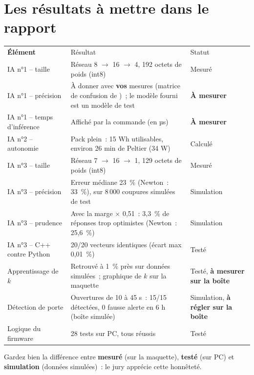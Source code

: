 \section{Les résultats à mettre dans le rapport}\label{sec:resultats}
\begin{tabularx}{\linewidth}{P{4.4cm}LP{2.6cm}}
 \textbf{Élément} & Résultat & Statut \\
IA n°1 -- taille & Réseau 8 $\rightarrow$ 16 $\rightarrow$ 4, 192 octets de poids (int8) & Mesuré \\
IA n°1 -- précision & À donner avec \textbf{vos} mesures (matrice de confusion de )~; le modèle fourni est un modèle de test & \textbf{À mesurer} \\
IA n°1 -- temps d'inférence & Affiché par la commande  (en µs) & \textbf{À mesurer} \\
IA n°2 -- autonomie & Pack plein~: 15 Wh utilisables, environ 26 min de Peltier (34 W) & Calculé \\
IA n°3 -- taille & Réseau 7 $\rightarrow$ 16 $\rightarrow$ 1, 129 octets de poids (int8) & Mesuré \\
IA n°3 -- précision & Erreur médiane 23~\% (Newton~: 33~\%), sur 8\,000 coupures simulées de test & Simulation \\
IA n°3 -- prudence & Avec la marge $\times$ 0,51~: 3,3~\% de réponses trop optimistes (Newton~: 25,6~\%) & Simulation \\
IA n°3 -- C++ contre Python & 20/20 vecteurs identiques (écart max 0,01~\%) & Testé \\
Apprentissage de $k$ & Retrouvé à 1~\% près sur données simulées~; graphique de $k$ sur la maquette & Testé, \textbf{à mesurer sur la boîte} \\
Détection de porte & Ouvertures de 10 à 45 s~: 15/15 détectées, 0 fausse alerte en 6 h (boîte simulée) & Simulation, \textbf{à régler sur la boîte} \\
Logique du firmware & 28 tests sur PC, tous réussis & Testé \\
\end{tabularx}
Gardez bien la différence entre \textbf{mesuré} (sur la maquette), \textbf{testé} (sur PC) et \textbf{simulation} (données simulées)~: le jury apprécie cette honnêteté.

